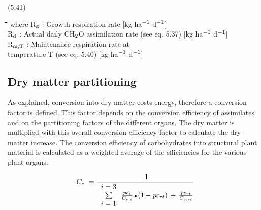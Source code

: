  
\strut\hfill (5.41)
\nwln
\begin{tabbing}
\hspace{1.27cm}\=\hspace{1.27cm}\=\hspace{1.27cm}\=\hspace{1.27cm}\=%
\hspace{1.27cm}\=\hspace{1.27cm}\=\hspace{1.27cm}\=\hspace{1.27cm}\=%
\hspace{1.27cm}\=\hspace{1.27cm}\=\kill
where R$_{{\rm g}}$ : Growth respiration rate        [kg ha$^{{\rm -1}}$ d$^{{\rm -1}}$]\\
R$_{{\rm d}}$ : Actual daily CH$_{{\rm 2}}$O assimilation rate (see eq. 5.37)        [kg ha$^{{\rm -1}}$ d$^{{\rm -1}}$]\\
R$_{{\rm m,T}}$ : Maintenance respiration rate at \\
   temperature T (see eq. 5.40)        [kg ha$^{{\rm -1}}$ d$^{{\rm -1}}$]
\end{tabbing}




\subsection{Dry matter partitioning  }

As explained, conver\-sion into dry matter costs energy, therefore a conversion factor is
defined. This factor depends on the conversion efficiency of assimi\-lates and on the
partition\-ing factors of the different organs. The dry matter is multiplied with this overall
conver\-sion efficiency factor to calculate the dry matter increase. The conver\-sion effi\-ciency of carbohy\-drates into structural plant material is calculated as a weighted average
of the efficiencies for the various plant organs.

\begin{displaymath}
C _{e} ~={\frac{~1}{\begin{array}{c}{i=3}  \\
\sum  \\
{i=1}\end{array} \,{\frac{pc _{i} }{C _{e,i} }} \, {\rm \Bullet{0.75ex}}\, (1-pc _{rt} )\, +\,{\frac{ pc _{rt} }{C _{e,rt} }} }}
\end{displaymath}





